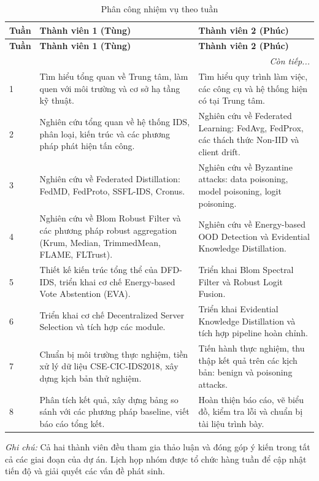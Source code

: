 \begin{longtable}{|p{1.1cm}|p{6.2cm}|p{6.2cm}|}
\caption{Phân công nhiệm vụ theo tuần}
\label{tab:task_assignment}\\
\hline
\textbf{Tuần} & \textbf{Thành viên 1 (Tùng)} & \textbf{Thành viên 2 (Phúc)} \\
\hline
\endfirsthead

\hline
\textbf{Tuần} & \textbf{Thành viên 1 (Tùng)} & \textbf{Thành viên 2 (Phúc)} \\
\hline
\endhead

\hline
\multicolumn{3}{|r|}{\textit{Còn tiếp...}} \\
\endfoot

\hline
\endlastfoot

1 & Tìm hiểu tổng quan về Trung tâm, làm quen với môi trường và cơ sở hạ tầng kỹ thuật. & Tìm hiểu quy trình làm việc, các công cụ và hệ thống hiện có tại Trung tâm. \\
\hline
2 & Nghiên cứu tổng quan về hệ thống IDS, phân loại, kiến trúc và các phương pháp phát hiện tấn công. & Nghiên cứu về Federated Learning: FedAvg, FedProx, các thách thức Non-IID và client drift. \\
\hline
3 & Nghiên cứu về Federated Distillation: FedMD, FedProto, SSFL-IDS, Cronus. & Nghiên cứu về Byzantine attacks: data poisoning, model poisoning, logit poisoning. \\
\hline
4 & Nghiên cứu về Blom Robust Filter và các phương pháp robust aggregation (Krum, Median, TrimmedMean, FLAME, FLTrust). & Nghiên cứu về Energy-based OOD Detection và Evidential Knowledge Distillation. \\
\hline
5 & Thiết kế kiến trúc tổng thể của DFD-IDS, triển khai cơ chế Energy-based Vote Abstention (EVA). & Triển khai Blom Spectral Filter và Robust Logit Fusion. \\
\hline
6 & Triển khai cơ chế Decentralized Server Selection và tích hợp các module. & Triển khai Evidential Knowledge Distillation và tích hợp pipeline hoàn chỉnh. \\
\hline
7 & Chuẩn bị môi trường thực nghiệm, tiền xử lý dữ liệu CSE-CIC-IDS2018, xây dựng kịch bản thử nghiệm. & Tiến hành thực nghiệm, thu thập kết quả trên các kịch bản: benign và poisoning attacks. \\
\hline
8 & Phân tích kết quả, xây dựng bảng so sánh với các phương pháp baseline, viết báo cáo tổng kết. & Hoàn thiện báo cáo, vẽ biểu đồ, kiểm tra lỗi và chuẩn bị tài liệu trình bày. \\
\hline
\end{longtable}

\vspace{1cm}

\textit{Ghi chú:} Cả hai thành viên đều tham gia thảo luận và đóng góp ý kiến trong tất cả các giai đoạn của dự án. Lịch họp nhóm được tổ chức hàng tuần để cập nhật tiến độ và giải quyết các vấn đề phát sinh.

\pagebreak



